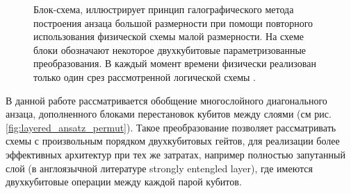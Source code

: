 \documentclass[14pt]{extarticle}
\begin{document}
\begin{figure}[H]
\caption{Блок-схема, иллюстрирует принцип галографического метода построения анзаца большой размерности при помощи повторного использования физической схемы малой размерности. На схеме блоки обозначают некоторое двухкубитовые параметризованные преобразования. В каждый момент времени физически реализован только один срез рассмотренной логической схемы \cite{Foss_Feig_2021} .}\label{fig:MPS_compl}
\end{figure}


\qquad В данной работе рассматривается обобщение многослойного диагонального анзаца, дополненного блоками перестановок кубитов между слоями (см рис. \ref{fig:layered_ansatz_permut}). Такое преобразование позволяет рассматривать схемы с произвольным порядком двухкубитовых гейтов, для реализации более эффективных архитектур при тех же затратах, например полностью запутанный слой (в англоязычной литературе strongly entengled layer), где имеются двухкубитовые операции между каждой парой кубитов. 
\end{document}
